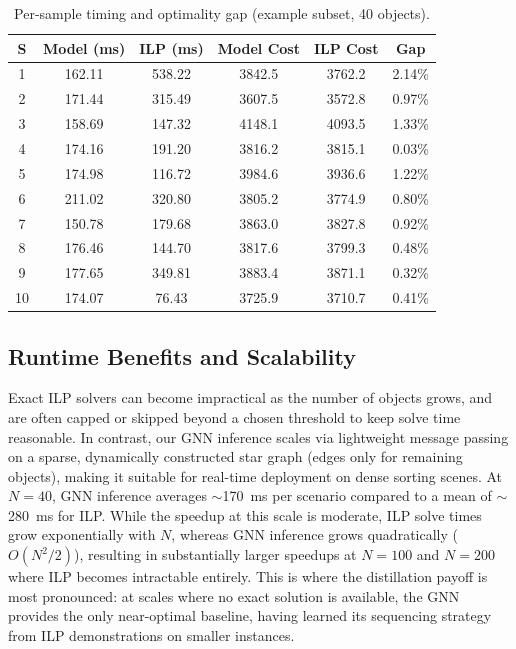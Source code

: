 \documentclass[conference]{IEEEtran}
\begin{document}
\begin{table}[htbp]
\caption{Per-sample timing and optimality gap (example subset, 40 objects).}
\label{tab:timing_ilp_gap}
\centering
\begin{tabular}{|c|c|c|c|c|c|}
\hline
\textbf{S} & \textbf{Model (ms)} & \textbf{ILP (ms)} & \textbf{Model Cost} & \textbf{ILP Cost} & \textbf{Gap} \\
\hline
1  & 162.11 & 538.22 & 3842.5 & 3762.2 & 2.14\% \\
2  & 171.44 & 315.49 & 3607.5 & 3572.8 & 0.97\% \\
3  & 158.69 & 147.32 & 4148.1 & 4093.5 & 1.33\% \\
4  & 174.16 & 191.20 & 3816.2 & 3815.1 & 0.03\% \\
5  & 174.98 & 116.72 & 3984.6 & 3936.6 & 1.22\% \\
6  & 211.02 & 320.80 & 3805.2 & 3774.9 & 0.80\% \\
7  & 150.78 & 179.68 & 3863.0 & 3827.8 & 0.92\% \\
8  & 176.46 & 144.70 & 3817.6 & 3799.3 & 0.48\% \\
9  & 177.65 & 349.81 & 3883.4 & 3871.1 & 0.32\% \\
10 & 174.07 & 76.43  & 3725.9 & 3710.7 & 0.41\% \\
\hline
\end{tabular}
\end{table}

\subsection{Runtime Benefits and Scalability}
Exact ILP solvers can become impractical as the number of objects grows, and are often capped or skipped beyond a chosen threshold to keep solve time reasonable.
In contrast, our GNN inference scales via lightweight message passing on a sparse, dynamically constructed star graph (edges only for remaining objects), making it suitable for real-time deployment on dense sorting scenes. At $N{=}40$, GNN inference averages $\sim$170~ms per scenario compared to a mean of $\sim$280~ms for ILP. While the speedup at this scale is moderate, ILP solve times grow exponentially with $N$, whereas GNN inference grows quadratically ($O(N^2/2)$), resulting in substantially larger speedups at $N{=}100$ and $N{=}200$ where ILP becomes intractable entirely. This is where the distillation payoff is most pronounced: at scales where no exact solution is available, the GNN provides the only near-optimal baseline, having learned its sequencing strategy from ILP demonstrations on smaller instances.
\end{document}
